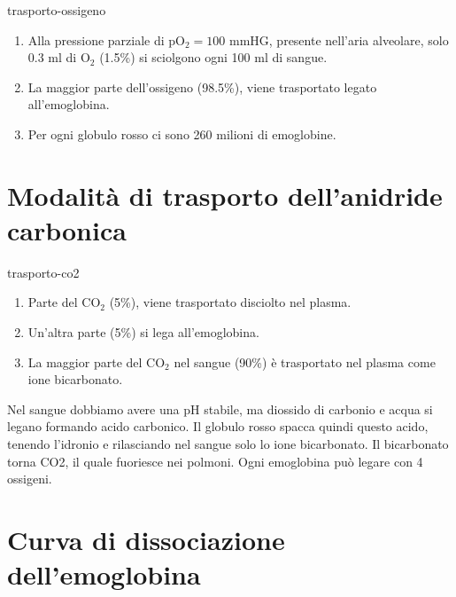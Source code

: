 \documentclass[preview]{standalone}
\begin{document}
\begin{snippet}{trasporto-ossigeno}
    \vspace{-0.5cm}
    \begin{enumerate}
        \item Alla pressione parziale di pO\({}_2=100\) mmHG, presente nell'aria alveolare,
        solo 0.3 ml di O\({}_2\) (1.5\%) si sciolgono ogni 100 ml di sangue.
        \item La maggior parte dell'ossigeno (98.5\%), viene trasportato legato all'emoglobina.
        \item Per ogni globulo rosso ci sono 260 milioni di emoglobine.
    \end{enumerate}
\end{snippet}

\section{Modalità di trasporto dell'anidride carbonica}

\begin{snippet}{trasporto-co2}
    \vspace{-0.5cm}
    \begin{enumerate}
        \item Parte del CO\({}_2\) (5\%), viene trasportato disciolto nel plasma.
        \item Un'altra parte (5\%) si lega all'emoglobina.
        \item La maggior parte del CO\({}_2\) nel sangue (90\%) è trasportato nel plasma come ione bicarbonato. 
    \end{enumerate}
    
    Nel sangue dobbiamo avere una pH stabile, ma diossido di carbonio e acqua
    si legano formando acido carbonico. Il globulo rosso spacca quindi questo acido,
    tenendo l'idronio e rilasciando nel sangue solo lo ione bicarbonato.
    Il bicarbonato torna CO2, il quale fuoriesce nei polmoni.
    Ogni emoglobina può legare con 4 ossigeni.
\end{snippet}

\section{Curva di dissociazione dell'emoglobina}

\end{document}
